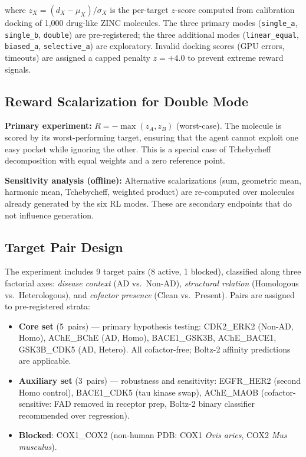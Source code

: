 \noindent where $z_X = (d_X - \mu_X) / \sigma_X$ is the per-target
$z$-score computed from calibration docking of 1{,}000 drug-like
ZINC molecules.  The three primary modes (\texttt{single\_a},
\texttt{single\_b}, \texttt{double}) are pre-registered;
the three additional modes (\texttt{linear\_equal},
\texttt{biased\_a}, \texttt{selective\_a}) are exploratory.
Invalid docking scores (GPU errors, timeouts) are assigned a
capped penalty $z = +4.0$ to prevent extreme reward signals.

\subsection{Reward Scalarization for Double Mode}
\label{sec:methods:reward}

\textbf{Primary experiment:} $R = -\max(z_A, z_B)$ (worst-case).
The molecule is scored by its worst-performing target, ensuring
that the agent cannot exploit one easy pocket while ignoring the
other.  This is a special case of Tchebycheff decomposition with
equal weights and a zero reference point.

\textbf{Sensitivity analysis (offline):} Alternative scalarizations
(sum, geometric mean, harmonic mean, Tchebycheff, weighted product)
are re-computed over molecules already generated by the six RL modes.
These are secondary endpoints that do not influence generation.

\subsection{Target Pair Design}
\label{sec:methods:pairs}

The experiment includes 9 target pairs (8 active, 1 blocked),
classified along three factorial axes: \emph{disease context}
(AD vs.\ Non-AD), \emph{structural relation} (Homologous vs.\
Heterologous), and \emph{cofactor presence} (Clean vs.\ Present).
Pairs are assigned to pre-registered strata:

\begin{itemize}
\item \textbf{Core set} (5~pairs) --- primary hypothesis testing:
  CDK2\_ERK2 (Non-AD, Homo), AChE\_BChE (AD, Homo),
  BACE1\_GSK3B, AChE\_BACE1, GSK3B\_CDK5 (AD, Hetero).
  All cofactor-free; Boltz-2 affinity predictions are applicable.
\item \textbf{Auxiliary set} (3~pairs) --- robustness and sensitivity:
  EGFR\_HER2 (second Homo control), BACE1\_CDK5 (tau kinase swap),
  AChE\_MAOB (cofactor-sensitive: FAD removed in receptor prep,
  Boltz-2 binary classifier recommended over regression).
\item \textbf{Blocked}: COX1\_COX2 (non-human PDB: COX1 \emph{Ovis
  aries}, COX2 \emph{Mus musculus}).
\end{itemize}

